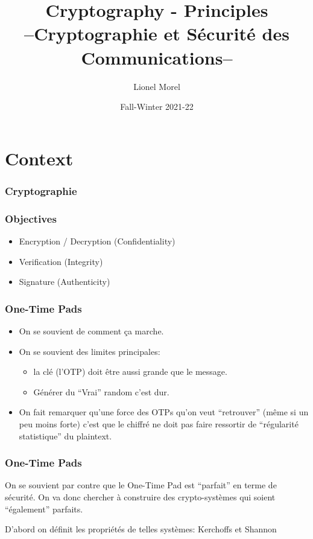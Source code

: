 \documentclass[
hyperref={pdfpagelabels=false}
,xcolor=table
]
{beamer}
\title[CSC - Intro]{Cryptography - Principles \\ --Cryptographie et Sécurité des Communications--}
\author[]{Lionel Morel}
\institute[]{Telecommunications - INSA Lyon}
\date{Fall-Winter 2021-22}
\begin{document}
\begin{frame}
  \maketitle
\end{frame}

\section{Context}

\begin{frame}
  \frametitle{Cryptographie}
\end{frame}


\begin{frame}
  \frametitle{Objectives}

  \begin{itemize}
  \item Encryption / Decryption (Confidentiality)
  \item Verification (Integrity)
  \item Signature (Authenticity)
  \end{itemize}
\end{frame}

\begin{frame}
  \frametitle{One-Time Pads}

  \begin{itemize}
  \item On se souvient de comment ça marche.
  \item On se souvient des limites principales:
    \begin{itemize}
    \item la clé (l'OTP) doit être aussi grande que le message.
    \item Générer du ``Vrai'' random c'est dur. 
    \end{itemize}
  \item On fait remarquer qu'une force des OTPs qu'on veut
    ``retrouver'' (même si un peu moins forte) c'est que le chiffré ne
    doit pas faire ressortir de ``régularité statistique'' du
    plaintext.
  \end{itemize}
\end{frame}


\begin{frame}
  \frametitle{One-Time Pads}

  On se souvient par contre que le One-Time Pad est ``parfait'' en terme de sécurité. On va donc chercher à construire des crypto-systèmes qui soient ``également'' parfaits.

  D'abord on définit les propriétés de telles systèmes: Kerchoffs et Shannon
  
\end{frame}
\end{document}
